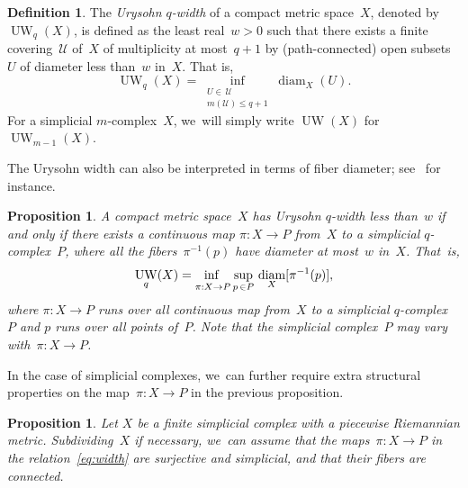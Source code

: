 \documentclass[11pt]{article}
\newtheorem{proposition}[theorem]{Proposition}
\theoremstyle{definition}
\newtheorem{definition}[theorem]{Definition}
\DeclareMathOperator\diam{diam}
\DeclareMathOperator{\UW}{UW}
\numberwithin{equation}{section}
\begin{document}
\begin{definition} \label{def:UW}
The \emph{Urysohn $q$-width} of a compact metric space~$X$, denoted by $\UW_q(X)$, is defined as the least real~$w >0$ such that there exists a finite covering~$\mathcal{U}$ of~$X$ of multiplicity at most~$q+1$ by (path-connected) open subsets~$U$ of diameter less than~$w$ in~$X$.
That is,
\[
\UW_q(X) = \inf_{\substack{U \in \, \mathcal{U} \\ m(\mathcal{U}) \leq q+1}} \diam_X(U).
\]
For a simplicial $m$\nobreakdash-complex~$X$, we~will simply write $\UW(X)$ for~$\UW_{m-1}(X)$.
\end{definition}

The Urysohn width can also be interpreted in terms of fiber diameter; see~\cite[Lem.\,0.8]{Guth17} for instance.

\begin{proposition} \label{prop:UW}
A compact metric space~$X$ has Urysohn $q$-width less than~$w$ if and only if there exists a continuous map $\pi:X \to P$ from~$X$ to a simplicial $q$-complex~$P$, where all the fibers~$\pi^{-1}(p)$ have diameter at most~$w$ in~$X$.
That~is,
\begin{equation} \label{eq:width}
\UW_q(X) = \adjustlimits \inf_{\pi:X \to P} \sup_{p \, \in P} \, \diam_X [\pi^{-1}(p)],
\end{equation}
where $\pi:X \to P$ runs over all continuous map from~$X$ to a simplicial $q$-complex~$P$ and $p$ runs over all points of~$P$.
Note that the simplicial complex~$P$ may vary with~$\pi:X \to P$.
\end{proposition}

In the case of simplicial complexes, we~can further require extra structural properties on the map~$\pi:X \to P$ in the previous proposition.

\begin{proposition} \label{prop:width}
Let $X$ be a finite simplicial complex with a piecewise Riemannian metric.
Subdividing~$X$ if necessary, we~can assume that the maps~$\pi:X \to P$ in the relation~\eqref{eq:width} are surjective and simplicial, and that their fibers are connected.
\end{proposition}
\end{document}
